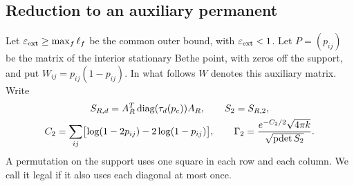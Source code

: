 \subsection{Reduction to an auxiliary permanent}\label{costes:permanente}

Let $\varepsilon_{\rm ext}\ge\max_f\ell_f$ be the common outer bound, with $\varepsilon_{\rm ext}<1$.
Let $P=(p_{ij})$ be the matrix of the interior stationary Bethe point, with zeros off the support, and put
$W_{ij}=p_{ij}(1-p_{ij})$. In what follows $W$ denotes this auxiliary matrix. Write
\begin{equation}\label{coste:rook-def}
 \begin{gathered}
 S_{R,d}=A_R^T\operatorname{diag}(\tau_d(p_e))A_R,\qquad S_2=S_{R,2},\\
 C_2=\sum_{ij}\bigl[\log(1-2p_{ij})-2\log(1-p_{ij})\bigr],\qquad
 \Gamma_2=\frac{e^{-C_2/2}\sqrt{4\pi k}}{\sqrt{\operatorname{pdet} S_2}} .
 \end{gathered}
\end{equation}
A permutation on the support uses one square in each row and each column. We call it legal
if it also uses each diagonal at most once.

